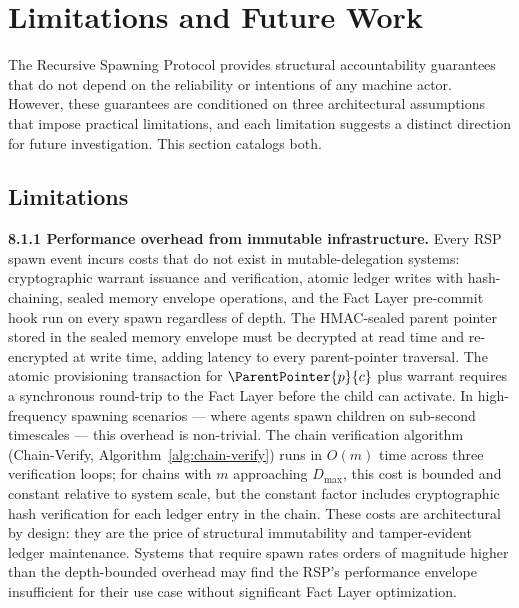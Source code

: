 \section{Limitations and Future Work}
\label{sec:rs-limitations}

The Recursive Spawning Protocol provides structural accountability guarantees that do not depend on the reliability or intentions of any machine actor. However, these guarantees are conditioned on three architectural assumptions that impose practical limitations, and each limitation suggests a distinct direction for future investigation. This section catalogs both.

\subsection{Limitations}
\label{sec:rs-limitations-sub}

\medskip
\noindent\textbf{8.1.1  Performance overhead from immutable infrastructure.}
Every RSP spawn event incurs costs that do not exist in mutable-delegation systems: cryptographic warrant issuance and verification, atomic ledger writes with hash-chaining, sealed memory envelope operations, and the Fact Layer pre-commit hook run on every spawn regardless of depth. The HMAC-sealed parent pointer stored in the sealed memory envelope must be decrypted at read time and re-encrypted at write time, adding latency to every parent-pointer traversal. The atomic provisioning transaction for $\ParentPointer{p}{c}$ plus warrant requires a synchronous round-trip to the Fact Layer before the child can activate. In high-frequency spawning scenarios — where agents spawn children on sub-second timescales — this overhead is non-trivial. The chain verification algorithm (Chain-Verify, Algorithm~\ref{alg:chain-verify}) runs in $O(m)$ time across three verification loops; for chains with $m$ approaching $D_{\max}$, this cost is bounded and constant relative to system scale, but the constant factor includes cryptographic hash verification for each ledger entry in the chain. These costs are architectural by design: they are the price of structural immutability and tamper-evident ledger maintenance. Systems that require spawn rates orders of magnitude higher than the depth-bounded overhead may find the RSP's performance envelope insufficient for their use case without significant Fact Layer optimization.

